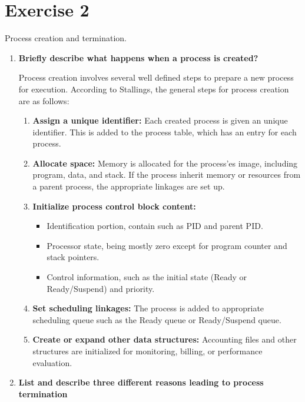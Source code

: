 \documentclass{article}
\newcommand{\exercise}[1]{
    \section*{Exercise #1}
    \markboth{Exercise #1}{}
}
\begin{document}
\newpage
\exercise{2}
Process creation and termination.
\begin{enumerate}[label=\textbf{\alph*})]
    \item
    \textbf{Briefly describe what happens when a process is created?}

    Process creation involves several well defined steps to prepare a new
    process for execution. According to Stallings\cite{stallings}, the general
    steps for process creation are as follows:
    
    \begin{enumerate}[label=\textbf{\arabic*.}]
        \item \textbf{Assign a unique identifier:} Each created process is given an unique
        identifier. This is added to the process table, which has an entry for each process.
    
        \item \textbf{Allocate space:} Memory is allocated for the process'es image,
        including program, data, and stack. If the process inherit memory or
        resources from a parent process, the appropriate linkages are set up.
    
        \item \textbf{Initialize process control block content:}
        \begin{itemize}
            \item Identification portion, contain such as PID and parent PID.
            \item Processor state, being mostly zero except for program counter and stack pointers.
            \item Control information, such as the initial state
            (Ready or Ready/Suspend) and priority.
        \end{itemize}
    
        \item \textbf{Set scheduling linkages:} The process is added to
        appropriate scheduling queue such as the Ready queue or Ready/Suspend queue.
    
        \item \textbf{Create or expand other data structures:} Accounting files and
        other structures are initialized for monitoring, billing, or performance evaluation.
    \end{enumerate}
        

    \pagebreak
    \item
    \textbf{List and describe three different reasons leading to process termination}


\end{enumerate}
\end{document}
